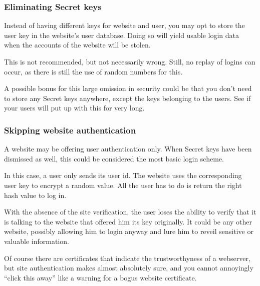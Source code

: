 \subsubsection{Eliminating Secret keys}
Instead of having different keys for website and user,
you may opt to store the user key in the website's user database.
Doing so will yield usable login data when the accounts of the website will be stolen.
\par
This is not recommended,
but not necessarily wrong.
Still,
no replay of logins can occur,
as there is still the use of random numbers for this.
\par
A possible bonus for this large omission in security could be that you don't need to store any Secret keys anywhere,
except the keys belonging to the users.
See if your users will put up with this for very long.
\subsubsection{Skipping website authentication}
A website may be offering user authentication only.
When Secret keys have been dismissed as well,
this could be considered the most basic login scheme.
\par
In this case,
a user only sends its user id.
The website uses the corresponding user key to encrypt a random value.
All the user has to do is return the right hash value to log in.
\par
With the absence of the site verification,
the user loses the ability to verify that it is talking to the website that offered him its key originally.
It could be any other website,
possibly allowing him to login anyway and lure him to reveil sensitive or valuable information.
\par
Of course there are certificates that indicate the trustworthyness of a webserver,
but site authentication makes almost absolutely sure,
and you cannot annoyingly ``click this away'' like a warning for a bogus website certificate.
